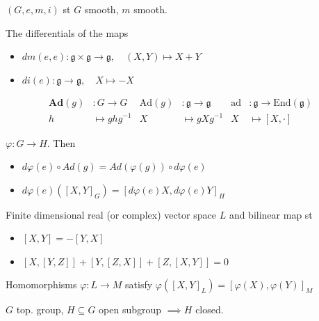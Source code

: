 \begin{definition}
$(G, e, m , i)$ st $G$ smooth, $m$ smooth.
\end{definition}

\begin{proposition} The differentials of the maps
\begin{itemize}[topsep=-6pt, itemsep=0pt]
    \item $dm (e,e) : \mathfrak{g} \times \mathfrak{g} \to \mathfrak{g}, \quad  (X, Y) \mapsto X + Y$ 
    \item $di (e) : \mathfrak{g} \to  \mathfrak{g}, \quad X \mapsto -X$ 
\end{itemize}
\end{proposition}

\begin{definition}[Adjoints]
\begin{align*}
\mathrm{\textbf{Ad}}(g) &: G \to G & \mathrm{Ad}(g) &: \mathfrak{g} \to \mathfrak{g} & \mathrm{ad} &: \mathfrak{g} \to \mathrm{End}(\mathfrak{g}) \\
h &\mapsto ghg^{-1} & X &\mapsto gXg^{-1} & X &\mapsto [X,\cdot]
\end{align*}
\end{definition}

\begin{proposition}
$\varphi : G \to H$. Then
\begin{itemize}[topsep=-6pt, itemsep=0pt]
    \item $ d \varphi (e) \circ Ad(g) = Ad(\varphi (g)) \circ d \varphi (e) $ 
    \item $d\varphi (e) ([X,Y]_G) = [d\varphi (e) X, d\varphi (e)Y]_H$ 
\end{itemize}
\end{proposition}

\begin{definition} Finite dimensional real (or complex) vector space $L$ and bilinear map st
\begin{itemize}[topsep=-6pt, itemsep=0pt]
    \item $[X, Y] = -[Y, X]$ 
    \item $[X, [Y, Z]] + [Y, [Z, X]] + [Z, [X, Y]] = 0$
\end{itemize}
Homomorphisms $\varphi : L \to M$  satisfy $\varphi ([X, Y]_L) = [\varphi (X), \varphi (Y)]_M $ 
\end{definition}

\begin{proposition} $G$ top. group, $H \subseteq G$ open subgroup $ \implies H$ closed.
\end{proposition}

